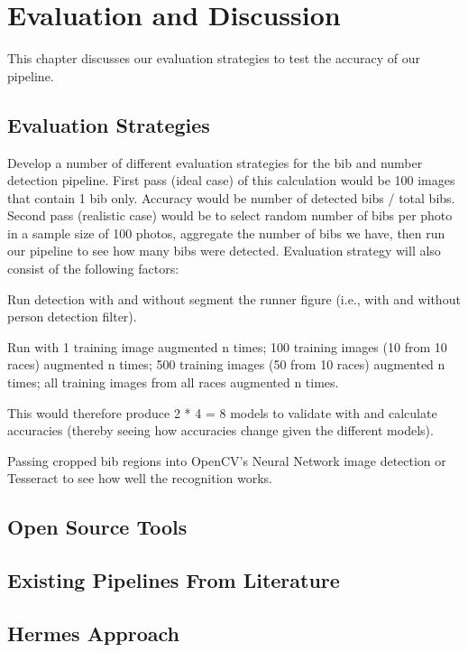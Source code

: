 \chapter{Evaluation and Discussion}
\label{ch:evaluation}

This chapter discusses our evaluation strategies to test the accuracy of our pipeline.




\section{Evaluation Strategies}

Develop a number of different evaluation strategies for the bib and number detection pipeline. First pass (ideal case) of this calculation would be 100 images that contain 1 bib only. Accuracy would be number of detected bibs / total bibs. Second pass (realistic case) would be to select random number of bibs per photo in a sample size of 100 photos, aggregate the number of bibs we have, then run our pipeline to see how many bibs were detected. Evaluation strategy will also consist of the following factors:

Run detection with and without segment the runner figure (i.e., with and without person detection filter).

Run with 1 training image augmented n times; 100 training images (10 from 10 races) augmented n times; 500 training images (50 from 10 races) augmented n times; all training images from all races augmented n times. 

This would therefore produce 2 * 4 = 8 models to validate with and calculate accuracies (thereby seeing how accuracies change given the different models).

Passing cropped bib regions into OpenCV's Neural Network image detection or Tesseract to see how well the recognition works.


\section{Open Source Tools}

\section{Existing Pipelines From Literature}

\section{Hermes Approach}

